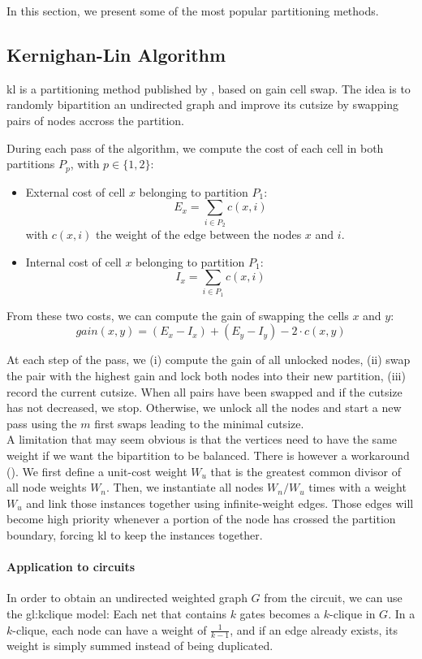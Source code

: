\documentclass[11pt,a4paper]{report} %
\theoremstyle{customdef}
\begin{document}
In this section, we present some of the most popular partitioning methods.






\subsection{Kernighan-Lin Algorithm}
\gls{kl} is a partitioning method published by \citet{Kernighan1970}, based on gain cell swap.
The idea is to randomly bipartition an undirected graph and improve its cutsize by swapping pairs of nodes accross the partition.

During each pass of the algorithm, we compute the cost of each cell in both partitions $P_p$, with $p \in \{1,2\}$:
\begin{itemize}
	\item External cost of cell $x$ belonging to partition $P_1$: \[E_x = \sum_{i \in P_2} c(x,i)\] with $c(x,i)$ the weight of the edge between the nodes $x$ and $i$.
	\item Internal cost of cell $x$ belonging to partition $P_1$: \[I_x = \sum_{i \in P_1} c(x,i)\]
\end{itemize}

From these two costs, we can compute the gain of swapping the cells $x$ and $y$:
\[gain(x,y) = (E_x - I_x) + (E_y - I_y) - 2 \cdot c(x,y)\]

At each step of the pass, we (i) compute the gain of all unlocked nodes, (ii) swap the pair with the highest gain and lock both nodes into their new partition, (iii) record the current cutsize.
When all pairs have been swapped and if the cutsize has not decreased, we stop. Otherwise, we unlock all the nodes and start a new pass using the $m$ first swaps leading to the minimal cutsize.\\

A limitation that may seem obvious is that the vertices need to have the same weight if we want the bipartition to be balanced.
There is however a workaround (\citet[p. 41]{KahngAndrewB.Lienig2011}). We first define a unit-cost weight $W_u$ that is the greatest common divisor of all node weights $W_n$.
Then, we instantiate all nodes $W_n/W_u$ times with a weight $W_u$ and link those instances together using infinite-weight edges.
Those edges will become high priority whenever a portion of the node has crossed the partition boundary, forcing \gls{kl} to keep the instances together.


\paragraph{Application to circuits}
In order to obtain an undirected weighted graph $G$ from the circuit, we can use the \gls{gl:kclique} model: Each net that contains $k$ gates becomes a $k$-clique in $G$.
In a $k$-clique, each node can have a weight of $\frac{1}{k-1}$, and if an edge already exists, its weight is simply summed instead of being duplicated.
\end{document}
